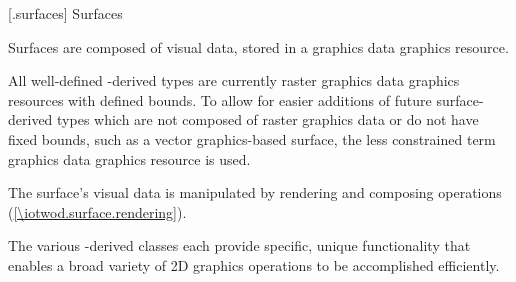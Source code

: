 
 [\iotwod.surfaces] {Surfaces}

\pnum
Surfaces are composed of visual data, stored in a graphics data graphics resource.
\begin{note}
All well-defined -derived types are currently raster graphics data graphics resources with defined bounds. To allow for easier additions of future surface-derived types which are not composed of raster graphics data or do not have fixed bounds, such as a vector graphics-based surface, the less constrained term graphics data graphics resource is used.
\end{note}

\pnum
The surface's visual data is manipulated by rendering and composing operations (\ref{\iotwod.surface.rendering}).

\pnum
The various -derived classes each provide specific, unique functionality that enables a broad variety of 2D graphics operations to be accomplished efficiently.

\addtocounter{SectionDepthBase}{1}


















\addtocounter{SectionDepthBase}{-1}
